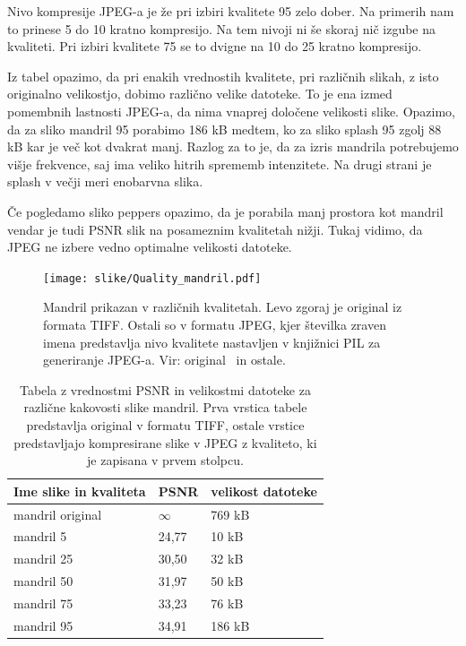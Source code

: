 \documentclass[a4paper,12pt,openright]{book}
\begin{document}
Nivo kompresije JPEG-a je že pri izbiri kvalitete 95 zelo dober. Na primerih nam to prinese 5 do 10 kratno kompresijo. Na tem nivoji ni še skoraj nič izgube na kvaliteti. Pri izbiri kvalitete 75 se to dvigne na 10 do 25 kratno kompresijo.\par
Iz tabel opazimo, da pri enakih vrednostih kvalitete, pri različnih slikah, z isto originalno velikostjo, dobimo različno velike datoteke. To je ena izmed pomembnih lastnosti JPEG-a, da nima vnaprej določene velikosti slike. Opazimo, da za sliko mandril 95 porabimo 186 kB medtem, ko za sliko splash 95 zgolj 88 kB kar je več kot dvakrat manj. Razlog za to je, da za izris mandrila potrebujemo višje frekvence, saj ima veliko hitrih sprememb intenzitete. Na drugi strani je splash v večji meri enobarvna slika.\par
Če pogledamo sliko peppers opazimo, da je porabila manj prostora kot mandril vendar je tudi PSNR slik na posameznim kvalitetah nižji. Tukaj vidimo, da JPEG ne izbere vedno optimalne velikosti datoteke.\par



\begin{figure}[ht] %
\begin{center}
\texttt{[image: slike/Quality\_mandril.pdf]}
\end{center}
\caption{Mandril prikazan v različnih kvalitetah. Levo zgoraj je original iz formata TIFF. Ostali so v formatu JPEG, kjer številka zraven imena predstavlja nivo kvalitete nastavljen v knjižnici PIL za generiranje JPEG-a. Vir: original~\cite{image_processing_slike} in ostale.}%
\label{Quality_mandril}
\end{figure}

\begin{table}[ht]
\centering
    \begin{tabular}{|l|l|l|}
    \hline
    Ime slike in kvaliteta &PSNR &velikost datoteke    \\
    \hline                      
    mandril original &$\infty$  & 769 kB          \\ 
    mandril 5        & 24,77    & 10 kB           \\
    mandril 25       & 30,50    & 32 kB           \\  
    mandril 50       & 31,97    & 50 kB           \\  
    mandril 75       & 33,23    & 76 kB           \\  
    mandril 95       & 34,91    & 186 kB           \\  
    \hline
    \end{tabular}
\label{tab:mandril_psnr}
\caption{Tabela z vrednostmi PSNR in velikostmi datoteke za različne kakovosti slike mandril. Prva vrstica tabele predstavlja original v formatu TIFF, ostale vrstice predstavljajo kompresirane slike v JPEG z kvaliteto, ki je zapisana v prvem stolpcu.}
\end{table}
\end{document}
